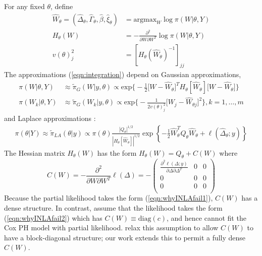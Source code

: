 \documentclass[]{article}
\begin{document}
For any fixed $\theta$, define
\begin{equation}\begin{aligned}\label{eqn:modeandhessian}
\widehat{W}_{\theta} = \left( \widehat{\Delta}_{\theta},\widehat{\Gamma}_{\theta},\widehat{\beta},\widehat{\xi}_{\theta}\right) &= \text{argmax}_{W}\log\pi(W|\theta,Y) \\ 
H_{\theta}(W) &= -\frac{\partial^{2}}{\partial W \partial W^{T}}\log\pi(W|\theta,Y) \\
v(\theta)_j^2 &= \left[H_\theta \left(\widehat{W}_{\theta}\right) ^ {-1} \right]_{jj}
\end{aligned}\end{equation}
The approximations (\ref{eqn:integration}) depend on Gaussian approximations,
\begin{equation}\begin{aligned}\label{eqn:gaussianapprox}
\pi(W|\theta,Y) &\approx \tilde{\pi}_{G}(W|y,\theta) \propto \text{exp}\biggl\{-\frac{1}{2} \bigg[W-\widehat{W}_{\theta} \bigg]^T H_\theta[\widehat{W}_{\theta}] \bigg[W-\widehat{W}_{\theta} \bigg] \biggr\} \\
\pi(W_{k}|\theta,Y) &\approx \tilde{\pi}_{G}(W_{k}|y,\theta) \propto\text{exp}\biggl\{-\frac{1}{2v(\theta)_j^2} \bigg[W_j-\widehat{W}_{\theta j} \bigg]^2 \biggr\}, k = 1,\ldots,m
\end{aligned}\end{equation}
and Laplace approximations \citet{tierney}:
\begin{equation}\begin{aligned}\label{eqn:laplace}
\pi(\theta|Y) \approx \tilde{\pi}_{LA}(\theta|y) \propto \pi(\theta)\frac{|Q_{\theta}|^{1/2}}{|H_{\theta}[\widehat{W}_{\theta}]|^{1/2}}\exp\left\{ -\frac{1}{2}\widehat{W}_{\theta}^{T}Q_{\theta}\widehat{W}_{\theta} + \ell\left(\widehat{\Delta}_{\theta};y \right)\right\}
\end{aligned}\end{equation}
The Hessian matrix $H_{\theta}(W)$ has the form $H_{\theta}(W) = Q_{\theta} + C(W)$ where
\begin{equation*}
C(W) = -\frac{\partial^{2}}{\partial W\partial W^{T}}\ell(\Delta) = -\begin{pmatrix}
\frac{\partial^{2}\ell(\Delta;y)}{\partial\Delta\partial\Delta^{T}} & 0 & 0 \\
0 & 0 & 0 \\
0 & 0 & 0 \\
\end{pmatrix}
\end{equation*}
Because the partial likelihood takes the form (\ref{eqn:whyINLAfail1}), $C(W)$ has a dense structure. In contrast, \citet{inla} assume that the likelihood takes the form (\ref{eqn:whyINLAfail2}) which has $C(W) \equiv \text{diag}(c)$, and hence cannot fit the Cox PH model with partial likelihood. \citet{casecross} relax this assumption to allow $C(W)$ to have a block-diagonal structure; our work extends this to permit a fully dense $C(W)$. 
\end{document}
